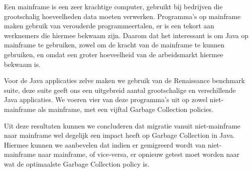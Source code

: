 Een mainframe is een zeer krachtige computer, gebruikt bij bedrijven die grootschalig hoeveelheden data moeten verwerken.
Programma's op mainframe maken gebruik van verouderde programmeertalen, er is een tekort aan werknemers die hiermee bekwaam zijn.
Daarom dat het interessant is om Java op mainframe te gebruiken, zowel om de kracht van de mainframe te kunnen gebruiken, en omdat een groter hoeveelheid van de arbeidsmarkt hiermee bekwaam is.


Voor de Java applicaties zelve maken we gebruik van de Renaissance benchmark suite, deze suite geeft ons een uitgebreid aantal grootschalige en verschillende Java applicaties.
We voeren vier van deze programma's uit op zowel niet-mainframe als mainframe, met een vijftal Garbage Collection policies.



Uit deze resultaten kunnen we concluderen dat migratie vanuit niet-mainframe naar mainframe wel degelijk een impact heeft op Garbage Collection in Java.
Hiermee kunnen we aanbevelen dat indien er gemigreerd wordt van niet-mainframe naar mainframe, of vice-versa, er opnieuw getest moet worden naar wat de optimaalste Garbage Collection policy is.





